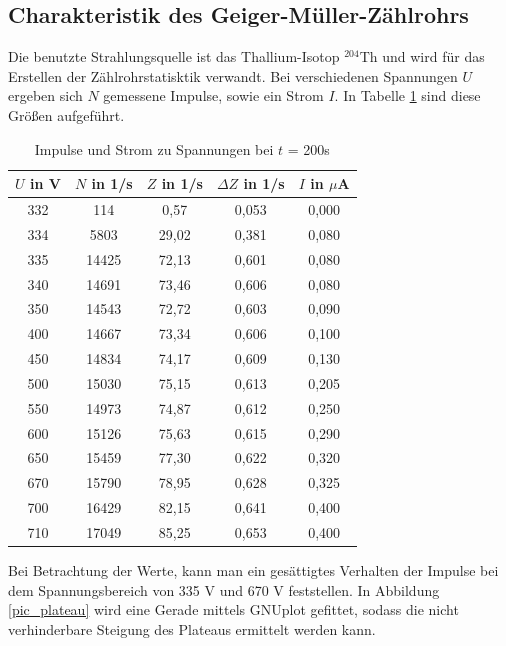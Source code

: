 \subsection{Charakteristik des Geiger-Müller-Zählrohrs}
Die benutzte Strahlungsquelle ist das Thallium-Isotop $^{204}$Th und wird für das Erstellen der Zählrohrstatisktik verwandt. Bei 
verschiedenen Spannungen $U$ ergeben sich $N$ gemessene Impulse, sowie ein Strom $I$. In Tabelle \ref{tab_charakteristik} sind diese
Größen aufgeführt.

\begin{table}[H]
 \begin{tabular}{c|c|c|c|c}
 $U$ in V & $N$ in 1/s & $Z$ in 1/s & $\Delta Z$ in 1/s & $I$ in $\mu$A \\
 \hline 
  332&	114	&0,57&	0,053&	0,000 \\
334&	5803	&29,02&	0,381&	0,080\\
335&	14425&	72,13&	0,601&	0,080\\
340&	14691&	73,46&	0,606&	0,080\\
350&	14543&	72,72&	0,603&	0,090\\
400&	14667&	73,34&	0,606&	0,100\\
450&	14834&	74,17&	0,609&	0,130\\
500&	15030&	75,15&	0,613&	0,205\\
550&	14973&	74,87&	0,612&	0,250\\
600&	15126&	75,63&	0,615&	0,290\\
650&	15459&	77,30&	0,622&	0,320\\
670&	15790&	78,95&	0,628&	0,325\\
700&	16429&	82,15&	0,641&	0,400\\
710&	17049&	85,25&	0,653 &	0,400\\
 \end{tabular}
\caption{Impulse und Strom zu Spannungen bei $t$ = 200s}
\label{tab_charakteristik}
 \end{table}

Bei Betrachtung der Werte, kann man ein gesättigtes Verhalten der Impulse bei dem Spannungsbereich von 335 V und 670 V feststellen. In
Abbildung \ref{pic_plateau} wird eine Gerade mittels GNUplot gefittet, sodass die nicht verhinderbare Steigung des Plateaus ermittelt
werden kann. 

